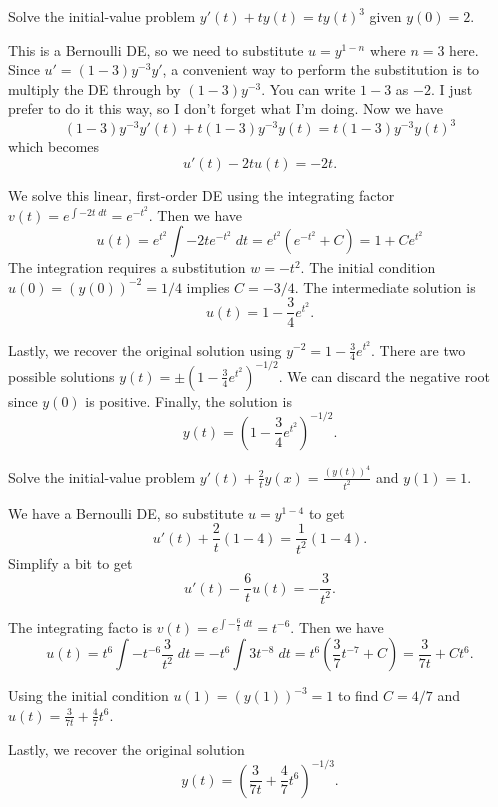 \documentclass[../main.tex]{subfiles}
\begin{document}
\begin{exercise}
  Solve the initial-value problem \(y'(t) + t y(t) = ty(t)^{3}\) given \(y(0) = 2\).

  \begin{solution}
    This is a Bernoulli DE, so we need to substitute \(u = y^{1-n}\) where \(n = 3\) here.  Since \(u' = (1-3)y^{-3}y'\), a convenient way to perform the substitution is to multiply the DE through by \((1-3)y^{-3}\). You can write \(1-3\) as \(-2\). I just prefer to do it this way, so I don't forget what I'm doing. Now we have
    \[
      (1-3)y^{-3}y'(t) + t (1-3)y^{-3}y(t) = t(1-3)y^{-3}y(t)^{3}
    \]
    which becomes
    \[
      u'(t) -2t u(t) = -2t.
    \]

    We solve this linear, first-order DE using the integrating factor \(v(t) = e^{\int -2t \;dt} = e^{-t^{2}}\).  Then we have
    \[
      u(t) = e^{t^{2}} \int -2t e^{-t^{2}} \;dt = e^{t^{2}}\left( e^{-t^{2}} + C \right) = 1 + C e^{t^{2}}
    \]
    The integration requires a substitution \(w = -t^{2}\).  The initial condition \(u(0) = \left( y(0) \right)^{-2} = 1/4\) implies \(C = -3/4\).  The intermediate solution is 
    \[
      u(t) = 1 - \frac{3}{4}e^{t^{2}}.
    \]

    Lastly, we recover the original solution using \(y^{-2} = 1 - \frac{3}{4}e^{t^{2}}\). There are two possible solutions \(y(t) = \pm \left( 1 - \frac{3}{4}e^{t^{2}} \right)^{-1/2}\). We can discard the negative root since \(y(0)\) is positive. Finally, the solution is 
    \[
      y(t) = \left( 1 - \frac{3}{4}e^{t^{2}} \right)^{-1/2}.
    \]
  \end{solution}
\end{exercise}

\begin{exercise}
  Solve the initial-value problem \(y'(t) + \frac{2}{t} y(x) = \frac{(y(t))^{4}}{t^{2}}\) and \(y(1) = 1\).

  \begin{solution}
    We have a Bernoulli DE, so substitute \(u = y^{1-4}\) to get
    \[
      u'(t) + \frac{2}{t}(1 - 4) = \frac{1}{t^{2}}(1-4).
    \]
    Simplify a bit to get
    \[
      u'(t) - \frac{6}{t}u(t) = -\frac{3}{t^{2}}.
    \]

    The integrating facto is \(v(t) = e^{\int - \frac{6}{t}\;dt} = t^{-6}\). Then we have
    \[
      u(t) = t^{6} \int - t^{-6} \frac{3}{t^{2}} \;dt = -t^{6} \int 3t^{-8} \;dt = t^{6} \left( \frac{3}{7} t^{-7} + C \right) = \frac{3}{7t} + C t^{6}.
    \]

    Using the initial condition \(u(1) = (y(1))^{-3} = 1\) to find \(C = 4/7\) and \(u(t) = \frac{3}{7t} + \frac{4}{7}t^{6}\).  %

    Lastly, we recover the original solution
    \[
      y(t) = \left( \frac{3}{7t} + \frac{4}{7} t^{6} \right)^{-1/3}.
    \]
  \end{solution}
\end{exercise}
\end{document}
